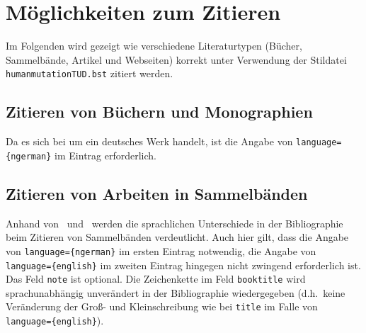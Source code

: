 \documentclass[a4paper,10pt]{scrartcl}
\begin{document}
\section{Möglichkeiten zum Zitieren}
Im Folgenden wird gezeigt wie verschiedene Literaturtypen (Bücher,
Sammelbände, Artikel und Webseiten) korrekt unter Verwendung der Stildatei
\verb|humanmutationTUD.bst| zitiert werden.
\subsection{Zitieren von Büchern und Monographien}
Da es sich bei  um ein deutsches Werk handelt, ist
die Angabe von \verb|language={ngerman}| im Eintrag erforderlich.


\subsection{Zitieren von Arbeiten in Sammelbänden}
Anhand von~ und~ werden
die sprachlichen Unterschiede in der Bibliographie beim Zitieren von
Sammelb\"anden verdeutlicht. Auch hier gilt, dass die Angabe von
\verb|language={ngerman}| im ersten Eintrag notwendig, die Angabe von
\verb|language={english}| im zweiten Eintrag hingegen nicht zwingend
erforderlich ist. Das Feld \verb|note| ist optional. Die Zeichenkette im Feld \verb|booktitle| wird sprachunabhängig unverändert in der Bibliographie wiedergegeben
(d.h.\ keine Veränderung der Gro{\ss}- und Kleinschreibung wie bei \verb|title| im Falle von \verb|language={english}|).
\end{document}
